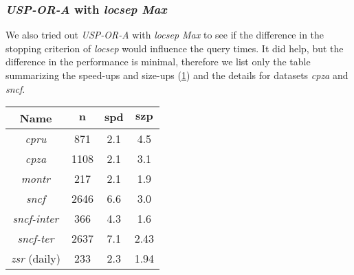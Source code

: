 	\subsubsection{\textit{USP-OR-A} with \textit{locsep Max}}
	
		\noindent We also tried out \textit{USP-OR-A} with \textit{locsep Max} to see if the difference in the stopping criterion of \textit{locsep} would influence the query times. It did help, but the difference in the performance is minimal, therefore we list only the table summarizing the speed-ups and size-ups (\ref{tab:usporam-speedup}) and the details for datasets \textit{cpza} and \textit{sncf}.
	
		\begin{table}[H]
			\centering
			\begin{tabular}{c|c|c|c}
	            \rowcolor{tablehead}
	            \textbf{Name} & $\bm{n}$ & $\bm{spd}$ & $\bm{szp}$ \\
				\hline
				\textit{cpru} & 871 & 2.1 & 4.5 \\
				\textit{cpza} & 1108 & 2.1 & 3.1 \\
				\textit{montr} & 217 & 2.1 & 1.9 \\
				\textit{sncf} & 2646 & 6.6 & 3.0 \\
				\textit{sncf-inter} & 366 & 4.3 & 1.6 \\
				\textit{sncf-ter} & 2637 & 7.1 & 2.43 \\
				\textit{zsr} (daily) & 233 & 2.3 & 1.94 \\	
			\end{tabular}
			\label{tab:usporam-speedup}
		\end{table}
		
		\begin{figure}[H]
		\centering
		\end{figure}
	
